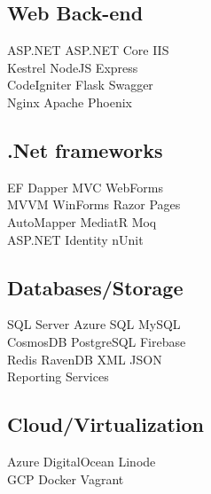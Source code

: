 \documentclass[letterpaper]{deedy-resume} %
\begin{document}
\begin{minipage}[t]{0.33\textwidth}
\sectionspace %

\subsection{Web Back-end}

ASP.NET \textbullet{} ASP.NET Core \textbullet{} IIS\\
Kestrel \textbullet{} NodeJS \textbullet{} Express\\
CodeIgniter \textbullet{} Flask \textbullet{} Swagger\\
Nginx \textbullet{} Apache \textbullet{} Phoenix

\sectionspace %

\subsection{.Net frameworks}

EF \textbullet{} Dapper \textbullet{} MVC \textbullet{} WebForms\\
MVVM \textbullet{} WinForms \textbullet{} Razor Pages\\
AutoMapper \textbullet{} MediatR \textbullet{} Moq\\
ASP.NET Identity \textbullet{} nUnit

\sectionspace %

\subsection{Databases/Storage}

SQL Server \textbullet{} Azure SQL \textbullet{} MySQL\\ 
CosmosDB \textbullet{} PostgreSQL \textbullet{} Firebase\\
Redis \textbullet{} RavenDB \textbullet{} XML \textbullet{} JSON\\
Reporting Services

\sectionspace %

\subsection{Cloud/Virtualization}

Azure \textbullet{} DigitalOcean \textbullet{} Linode\\ 
GCP \textbullet{} Docker \textbullet{} Vagrant

\sectionspace %


\end{minipage}
\end{document}

